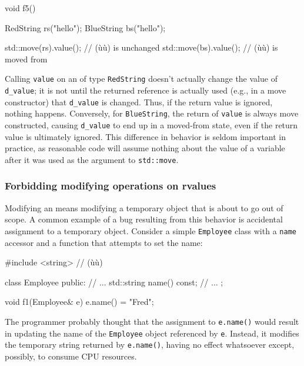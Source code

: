 \begin{emcppslisting}[emcppsbatch=e3]
void f5()
{
    RedString  rs("hello");
    BlueString bs("hello");

    std::move(rs).value();  // (ù{}ù) is unchanged
    std::move(bs).value();  // (ù{}ù) is moved from
}
\end{emcppslisting}
    

\noindent Calling \lstinline!value! on an  of type \lstinline!RedString!
doesn't actually change the value of \lstinline!d_value!; it is not until
the returned  reference is actually used (e.g., in a move
constructor) that \lstinline!d_value! is changed. Thus, if the return
value is ignored, nothing happens. Conversely, for \lstinline!BlueString!,
the return of \lstinline!value! is always move constructed, causing
\lstinline!d_value! to end up in a moved-from state, even if the return
value is ultimately ignored. This difference in behavior is seldom
important in practice, as reasonable code will assume nothing about the
value of a variable after it was used as the argument to
\lstinline!std::move!.

\subsubsection[Forbidding modifying operations on \romeovalue{rvalues}]{Forbidding modifying operations on {\sfbsubsubsecitalRomeo rvalues}}\label{forbidding-modifying-operations-on-rvalues}

Modifying an  means modifying a temporary object that is
about to go out of scope. A common example of a bug resulting from this
behavior is accidental assignment to a temporary object. Consider a
simple \lstinline!Employee! class with a \lstinline!name! accessor and a
function that attempts to set the name:

\begin{emcppslisting}[emcppsbatch=e4]
#include <string>   // (ù{}ù)

class Employee
{
public:
    // ...
    std::string name() const;
    // ...
};

void f1(Employee& e)
{
    e.name() = "Fred";
}
\end{emcppslisting}
    

\noindent The programmer probably thought that the assignment to \lstinline!e.name()!
would result in updating the name of the \lstinline!Employee! object
referenced by \lstinline!e!. Instead, it modifies the temporary string
returned by \lstinline!e.name()!, having no effect whatsoever except,
possibly, to consume CPU resources.

